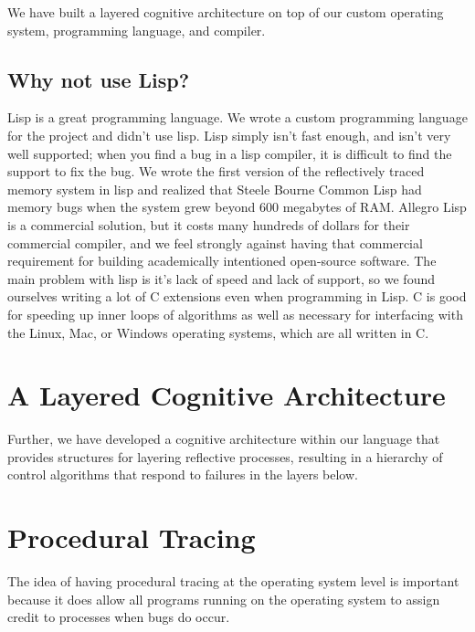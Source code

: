 We have built a layered cognitive architecture on top of our custom
operating system, programming language, and compiler.

\subsection{Why not use Lisp?}

Lisp is a great programming language.  We wrote a custom programming
language for the project and didn't use lisp.  Lisp simply isn't fast
enough, and isn't very well supported; when you find a bug in a lisp
compiler, it is difficult to find the support to fix the bug.  We
wrote the first version of the reflectively traced memory system in
lisp and realized that Steele Bourne Common Lisp had memory bugs when
the system grew beyond 600 megabytes of RAM.  Allegro Lisp is a
commercial solution, but it costs many hundreds of dollars for their
commercial compiler, and we feel strongly against having that
commercial requirement for building academically intentioned
open-source software.  The main problem with lisp is it's lack of
speed and lack of support, so we found ourselves writing a lot of C
extensions even when programming in Lisp.  C is good for speeding up
inner loops of algorithms as well as necessary for interfacing with
the Linux, Mac, or Windows operating systems, which are all written in
C.

\section{A Layered Cognitive Architecture}

Further, we have developed a cognitive architecture within our
language that provides structures for layering reflective processes,
resulting in a hierarchy of control algorithms that respond to
failures in the layers below.




\section{Procedural Tracing}

The idea of having procedural tracing at the operating system level is
important because it does allow all programs running on the operating
system to assign credit to processes when bugs do occur.


